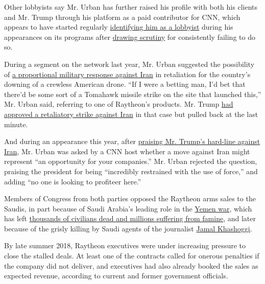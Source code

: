 Other lobbyists say Mr. Urban has further raised his profile with both
his clients and Mr. Trump through his platform as a paid contributor for
CNN, which appears to have started regularly
\href{https://twitter.com/mmfa/status/1145335186315497473}{identifying
him as a lobbyist} during his appearances on its programs after
\href{https://www.thedailybeast.com/david-urban-why-is-cnn-paying-a-trump-campaign-adviser}{drawing
scrutiny} for consistently failing to do so.

During a segment on the network last year, Mr. Urban suggested the
possibility of
\href{http://transcripts.cnn.com/TRANSCRIPTS/1906/20/cg.02.html}{a
proportional military response against Iran} in retaliation for the
country's downing of a crewless American drone. ``If I were a betting
man, I'd bet that there'd be some sort of a Tomahawk missile strike on
the site that launched this,'' Mr. Urban said, referring to one of
Raytheon's products. Mr. Trump
\href{https://www.nytimes.com/2019/06/20/world/middleeast/iran-us-drone.html}{had
approved a retaliatory strike against Iran} in that case but pulled back
at the last minute.

And during an appearance this year, after
\href{https://www.cnn.com/videos/tv/2020/01/08/intv-amanpour-david-urban-trump-iran.cnn}{praising
Mr. Trump's hard-line against Iran}, Mr. Urban was asked by a CNN host
whether a move against Iran might represent ``an opportunity for your
companies.'' Mr. Urban rejected the question, praising the president for
being ``incredibly restrained with the use of force,'' and adding ``no
one is looking to profiteer here.''

Members of Congress from both parties opposed the Raytheon arms sales to
the Saudis, in part because of Saudi Arabia's leading role in the
\href{https://www.nytimes.com/interactive/2018/10/26/world/middleeast/saudi-arabia-war-yemen.html}{Yemen
war}, which has left
\href{https://www.nytimes.com/interactive/2018/10/20/world/middleeast/saudi-arabia-invisible-war-yemen.html?module=inline}{thousands
of civilians dead and millions suffering from famine}, and later because
of the grisly killing by Saudi agents of the journalist
\href{https://www.nytimes.com/2018/10/16/world/middleeast/khashoggi-saudi-prince.html}{Jamal
Khashoggi}.

By late summer 2018, Raytheon executives were under increasing pressure
to close the stalled deals. At least one of the contracts called for
onerous penalties if the company did not deliver, and executives had
also already booked the sales as expected revenue, according to current
and former government officials.

